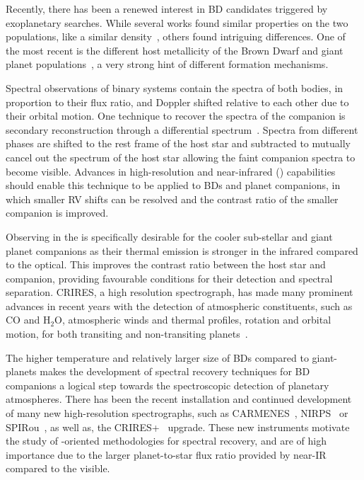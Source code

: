 Recently, there has been a renewed interest in BD candidates triggered by exoplanetary searches.
While several works found similar properties on the two populations, like a similar density~\citep{hatzes_definition_2015}, others found intriguing differences.
One of the most recent is the different host metallicity of the Brown Dwarf and giant planet populations~\citep{santos_observational_2017, schlaufman_evidence_2018}, a very strong hint of different formation mechanisms.

Spectral observations of binary systems contain the spectra of both bodies, in proportion to their flux ratio, and Doppler shifted relative to each other due to their orbital motion.
One technique to recover the spectra of the companion is secondary reconstruction through a differential spectrum~\citep{ferluga_separating_1997}.
Spectra from different phases are shifted to the rest frame of the host star and subtracted to mutually cancel out the spectrum of the host star allowing the faint companion spectra to become visible.
Advances in high-resolution and near-infrared (\nir{}) capabilities should enable this technique to be applied to BDs and planet companions, in which smaller {RV} shifts can be resolved and the contrast ratio of the smaller companion is improved.

Observing in the \nir{} is specifically desirable for the cooler sub-stellar and giant planet companions as their thermal emission is stronger in the infrared compared to the optical.
This improves the contrast ratio between the host star and companion, providing favourable conditions for their detection and spectral separation.
CRIRES, a high resolution \nir{} spectrograph, has made many prominent advances in recent years with the detection of atmospheric constituents, such as \(\textrm{CO} \) and \(\textrm{H}_{2}\textrm{O} \), atmospheric winds and thermal profiles, rotation and orbital motion, for both transiting and non-transiting planets~\citep[e.g.][]{snellen_orbital_2010, brogi_signature_2012, rodler_weighing_2012, dekok_detection_2013, brogi_carbon_2014, snellen_fast_2014, piskorz_evidence_2016, brogi_rotation_2016, birkby_discovery_2017}.

The higher temperature and relatively larger size of BDs compared to giant-planets makes the development of spectral recovery techniques for BD companions a logical step towards the spectroscopic detection of planetary atmospheres.
There has been the recent installation and continued development of many new high-resolution \nir{} spectrographs, such as {CARMENES}~\citep{quirrenbach_carmenes_2014}, NIRPS~\citep{bouchy_nearinfrared_2017} or SPIRou~\citep{artigau_spirou_2014}, as well as, the {CRIRES+}~\citep{dorn_crires_2016} upgrade.
These new instruments motivate the study of \nir{}-oriented methodologies for spectral recovery, and are of high importance due to the larger planet-to-star flux ratio provided by near-IR compared to the visible.


